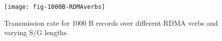 \begin{figure}[t]
\texttt{[image: fig-1000B-RDMAverbs]}
\caption{Transmission rate for 1000 B records over different RDMA verbs and 
varying S/G lengths.}
\label{fig:1000B_transrate}
\end{figure}
